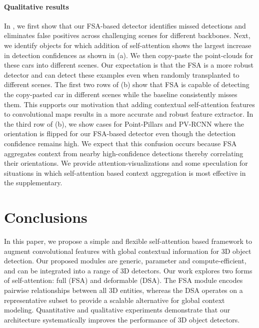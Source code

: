 \documentclass[10pt,twocolumn,letterpaper]{article}
\begin{document}
\paragraph{Qualitative results} In , we first show that our FSA-based detector identifies missed detections and eliminates false positives across challenging scenes for different backbones. 
Next, we identify objects for which addition of self-attention shows the largest increase in detection confidences as shown in (a). We then copy-paste the point-clouds for these cars into different scenes. Our expectation is that the FSA is a more robust detector and can detect these examples even when randomly transplanted to different scenes. The first two rows of (b) show that FSA is capable of detecting the copy-pasted car in different scenes while the baseline consistently misses them. This supports our motivation that adding contextual self-attention features to convolutional maps results in a more accurate and robust feature extractor. In the third row of (b), we show cases for Point-Pillars and PV-RCNN where the orientation is flipped for our FSA-based detector even though the detection confidence remains high. We expect that this confusion occurs because FSA aggregates context from nearby high-confidence detections thereby correlating their orientations. We provide attention-visualizations and some speculation for situations in which self-attention based context aggregation is most effective in the supplementary. \section{Conclusions}
In this paper, we propose a simple and flexible self-attention based framework to augment convolutional features with global contextual information for 3D object detection. Our proposed modules are generic, parameter and compute-efficient, and can be integrated into a range of 3D detectors. Our work explores two forms of self-attention: full (FSA) and deformable (DSA). The FSA module encodes pairwise relationships between all 3D entities, whereas the DSA operates on a representative subset to provide a scalable alternative for global context modeling. Quantitative and qualitative experiments demonstrate that our architecture systematically improves the performance of 3D object detectors. 
{\small


}
\end{document}
